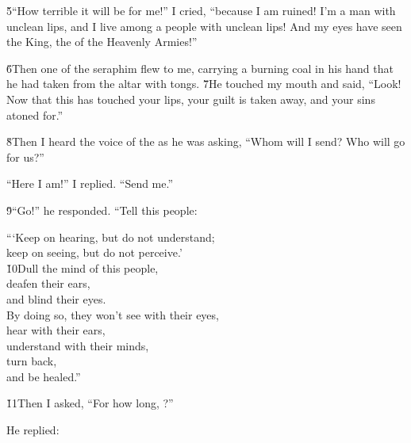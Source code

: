 \v{5}``How terrible it will be for me!'' I cried, ``because I am ruined! I'm a man with unclean lips, and I live among a people with unclean lips! And my eyes have seen the King, the  of the Heavenly Armies!''

\v{6}Then one of the seraphim flew to me, carrying a burning coal in his hand that he had taken from the altar with tongs. \v{7}He touched my mouth and said, ``Look! Now that this has touched your lips, your guilt is taken away, and your sins atoned for.''

\v{8}Then I heard the voice of the  as he was asking, ``Whom will I send? Who will go for us?''

``Here I am!'' I replied. ``Send me.''

\v{9}``Go!'' he responded. ``Tell this people:

\begin{poetry}
\poeml ```Keep on hearing, but do not understand; \\
\poemll    keep on seeing, but do not perceive.' \\
\poeml \v{10}Dull the mind of this people, \\
\poemll    deafen their ears, \\
\poemlll       and blind their eyes. \\
\poeml By doing so, they won't see with their eyes, \\
\poemll    hear with their ears, \\
\poeml understand with their minds, \\
\poemll    turn back, \\
\poemlll       and be healed.''
\end{poetry}

\v{11}Then I asked, ``For how long, ?''

He replied:

